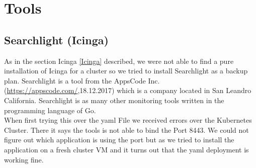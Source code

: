  
\chapter{Tools} %
\section{Searchlight (Icinga)}
\label{searchlight}
As in the section Icinga \ref{Icinga} described, we were not able to find a pure installation of Icinga for a cluster so we tried to install Searchlight as a backup plan.
Searchlight is a tool from the AppsCode Inc. (\url{https://appscode.com/},18.12.2017) which is a company located in San Leandro California. 
Searchlight is as many other monitoring tools written in the programming language of Go.
\\
When first trying this over the yaml File we received errors over the Kubernetes Cluster. There it says the tools is not able to bind the Port 8443. We could not figure out which application is using the port but as we tried to install the application on a fresh cluster VM and it turns out that the yaml deployment is working fine.
